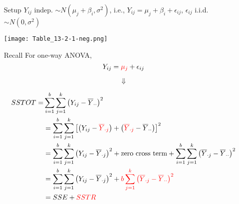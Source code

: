 \begin{frame}

	\begin{enumerate}
		\item[Setup] $Y_{ij}$ indep. $\sim N(\mu_j+\beta_i,\sigma^2)$, i.e., $Y_{ij} = \mu_j+\beta_i+\epsilon_{ij}$, $\epsilon_{ij}$ i.i.d. $\sim N(0,\sigma^2)$
			\vfill
		\item[]
			\begin{center}
				\texttt{[image: Table\_13-2-1-neg.png]}
			\end{center}
	\end{enumerate}
\end{frame}
\begin{frame}[fragile]
	\begin{enumerate}
		\item[Recall] For one-way ANOVA,
			\[
				Y_{ij} = \textcolor{red}{\mu_j} + \epsilon_{ij}
			\]
		\item[]
			\[\Downarrow\]
		\item[]
	\begin{align*}
		SSTOT = & \sum_{i=1}^b\sum_{j=1}^k \left(Y_{ij}-\overline{Y}_{\cdot\cdot} \right)^2
		     \\ & =  \sum_{i=1}^b\sum_{j=1}^k\left[ \left(Y_{ij}-\textcolor{red}{\overline{Y}_{\cdot j}} \right)+\left(\textcolor{red}{\overline{Y}_{\cdot j}} - \overline{Y}_{\cdot\cdot}\right)\right]^2
		     \\ & =  \sum_{i=1}^b\sum_{j=1}^k\left(Y_{ij}-\overline{Y}_{\cdot j} \right)^2+ \text{zero cross term}+\sum_{i=1}^b\sum_{j=1}^k\left(\overline{Y}_{\cdot j} - \overline{Y}_{\cdot\cdot}\right)^2
		     \\ & =  \sum_{i=1}^b\sum_{j=1}^k\left(Y_{ij}-\overline{Y}_{\cdot j} \right)^2+ \textcolor{red}{b\sum_{j=1}^k \left(\overline{Y}_{\cdot j} - \overline{Y}_{\cdot\cdot}\right)^2
}		      \\&= SSE +\textcolor{red}{SSTR}
	\end{align*}
	\end{enumerate}
\end{frame}

